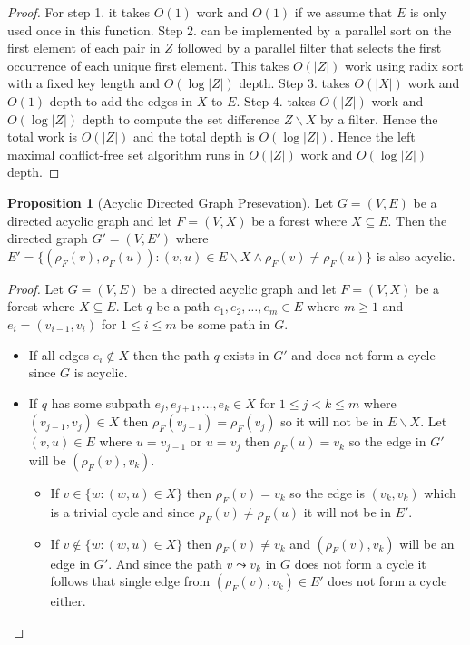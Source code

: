 \documentclass[a4paper,12pt]{article}
\theoremstyle{definition}
\newtheorem{proposition}{Proposition}[section]
\begin{document}
\begin{proof}
    For step 1. it takes $O(1)$ work and $O(1)$ if we assume that $E$ is only
    used once in this function. Step 2. can be implemented by a parallel sort on
    the first element of each pair in $Z$ followed by a parallel filter that
    selects the first occurrence of each unique first element. This takes
    $O(|Z|)$ work using radix sort with a fixed key length and $O(\log |Z|)$
    depth. Step 3. takes $O(|X|)$ work and $O(1)$ depth to add the edges in $X$
    to $E$. Step 4. takes $O(|Z|)$ work and $O(\log |Z|)$ depth to compute the
    set difference $Z \backslash X$ by a filter. Hence the total work is
    $O(|Z|)$ and the total depth is $O(\log |Z|)$. Hence the left maximal
    conflict-free set algorithm runs in $O(|Z|)$ work and $O(\log |Z|)$ depth.
\end{proof}


\begin{proposition}[Acyclic Directed Graph Presevation]\label{prop:acyclic-directed-graph-preservation}
    Let $G = (V, E)$ be a directed acyclic graph and let $F = (V, X)$ be a
    forest where $X \subseteq E$. Then the directed graph $G' = (V, E')$ where
    $E' = \{(\rho_F(v), \rho_F(u)) : (v, u) \in E \backslash X \land \rho_F(v)
    \neq \rho_F(u)\}$ is also acyclic.
\end{proposition}
\begin{proof}
    Let $G = (V, E)$ be a directed acyclic graph and let $F = (V, X)$ be a
    forest where $X \subseteq E$. Let $q$ be a path $e_1, e_2, \ldots, e_m \in
    E$ where $m \geq 1$ and $e_i = (v_{i-1}, v_i)$ for $1 \leq i \leq m$ be some
    path in $G$.
    \begin{itemize}
        \item If all edges $e_i \notin X$ then the path $q$ exists in $G'$ and
        does not form a cycle since $G$ is acyclic.
        \item If $q$ has some subpath $e_j, e_{j+1}, \ldots, e_k \in X$ for $1
        \leq j < k \leq m$ where $(v_{j - 1}, v_j) \in X$ then $\rho_F(v_{j-1})
        = \rho_F(v_{j})$ so it will not be in $E \backslash X$. Let $(v, u) \in
        E$ where $u  = v_{j - 1}$ or $u = v_j$ then $\rho_F(u) = v_k$ so the
        edge in $G'$ will be $(\rho_F(v), v_k)$.
        \begin{itemize}
            \item If $v \in \{w : (w, u) \in X\}$ then $\rho_F(v) = v_k$ so the
            edge is $(v_k, v_k)$ which is a trivial cycle and since $\rho_F(v)
            \neq \rho_F(u)$ it will not be in $E'$.
            \item If $v \notin \{w : (w, u) \in X\}$ then $\rho_F(v) \neq v_k$
            and $(\rho_F(v), v_k)$ will be an edge in $G'$. And since the path
            $v \leadsto v_k$ in $G$ does not form a cycle it follows that single
            edge from $(\rho_F(v), v_k) \in E'$ does not form a cycle either.
        \end{itemize}
    \end{itemize}
\end{proof}
\end{document}
